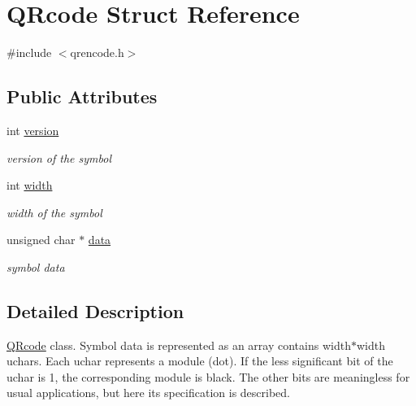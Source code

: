 \hypertarget{struct_q_rcode}{}\section{Q\+Rcode Struct Reference}
\label{struct_q_rcode}


{\ttfamily \#include $<$qrencode.\+h$>$}

\subsection*{Public Attributes}
\begin{DoxyCompactItemize}
\item 
\mbox{\label{struct_q_rcode_aa84ee8368a0cb437726e4eb4497784c0}} 
int \mbox{\hyperlink{struct_q_rcode_aa84ee8368a0cb437726e4eb4497784c0}{version}}
\begin{DoxyCompactList}\small\item\em version of the symbol \end{DoxyCompactList}\item 
\mbox{\label{struct_q_rcode_a70faea92be5450849d2252f286fc4cb2}} 
int \mbox{\hyperlink{struct_q_rcode_a70faea92be5450849d2252f286fc4cb2}{width}}
\begin{DoxyCompactList}\small\item\em width of the symbol \end{DoxyCompactList}\item 
\mbox{\label{struct_q_rcode_ae6f826314cfb99f4926c4c5734997c35}} 
unsigned char $\ast$ \mbox{\hyperlink{struct_q_rcode_ae6f826314cfb99f4926c4c5734997c35}{data}}
\begin{DoxyCompactList}\small\item\em symbol data \end{DoxyCompactList}\end{DoxyCompactItemize}


\subsection{Detailed Description}
\mbox{\hyperlink{struct_q_rcode}{Q\+Rcode}} class. Symbol data is represented as an array contains width$\ast$width uchars. Each uchar represents a module (dot). If the less significant bit of the uchar is 1, the corresponding module is black. The other bits are meaningless for usual applications, but here its specification is described.


